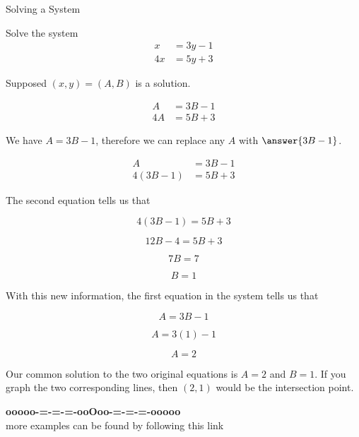 \documentclass{ximera}
\begin{document}
\begin{example} Solving a System


Solve the system
\begin{align*}
x & = 3y - 1 \\
4x & = 5y + 3
\end{align*}

\begin{explanation}


Supposed $(x, y) = (A, B)$ is a solution.


\begin{align*}
A & = 3B - 1 \\
4A & = 5B + 3
\end{align*}


We have $A = 3B - 1$, therefore we can replace any $A$ with $\answer{3B - 1}$.  

\begin{align*}
A & = 3B - 1 \\
4(3B - 1) & = 5B + 3
\end{align*}


The second equation tells us that 


\[   4(3B - 1) = 5B + 3   \]

\[   12B - 4 = 5B + 3   \]


\[ 7B = 7 \]


\[ B = 1 \]

With this new information, the first equation in the system tells us that

\[ A = 3B - 1 \]

\[ A = 3(1) - 1 \]

\[ A = 2 \]

Our common solution to the two original equations is $A = 2$ and $B = 1$.  If you graph the two corresponding lines, then $(2, 1)$ would be the intersection point.

\end{explanation}
\end{example}









\begin{center}
\textbf{\textcolor{green!50!black}{ooooo-=-=-=-ooOoo-=-=-=-ooooo}} \\

more examples can be found by following this link\\ 

\end{center}
\end{document}

